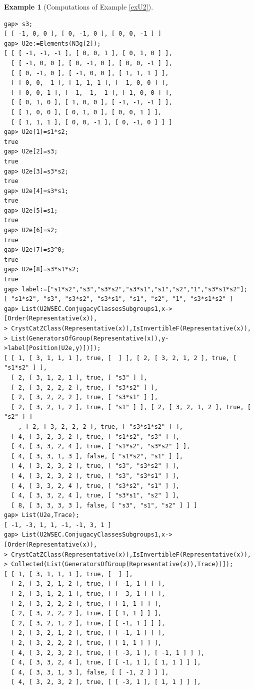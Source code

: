\documentclass{amsart}
\theoremstyle{plain}
\theoremstyle{definition}
\newtheorem{example}[theorem]{Example}
\theoremstyle{remark}
\begin{document}
\begin{example}[{Computations of Example \ref{exU2}}]
\begin{verbatim}
gap> s3;
[ [ -1, 0, 0 ], [ 0, -1, 0 ], [ 0, 0, -1 ] ]
gap> U2e:=Elements(N3g[2]);
[ [ [ -1, -1, -1 ], [ 0, 0, 1 ], [ 0, 1, 0 ] ], 
  [ [ -1, 0, 0 ], [ 0, -1, 0 ], [ 0, 0, -1 ] ], 
  [ [ 0, -1, 0 ], [ -1, 0, 0 ], [ 1, 1, 1 ] ], 
  [ [ 0, 0, -1 ], [ 1, 1, 1 ], [ -1, 0, 0 ] ], 
  [ [ 0, 0, 1 ], [ -1, -1, -1 ], [ 1, 0, 0 ] ], 
  [ [ 0, 1, 0 ], [ 1, 0, 0 ], [ -1, -1, -1 ] ], 
  [ [ 1, 0, 0 ], [ 0, 1, 0 ], [ 0, 0, 1 ] ], 
  [ [ 1, 1, 1 ], [ 0, 0, -1 ], [ 0, -1, 0 ] ] ]
gap> U2e[1]=s1*s2;
true
gap> U2e[2]=s3;
true
gap> U2e[3]=s3*s2;
true
gap> U2e[4]=s3*s1;
true
gap> U2e[5]=s1;
true
gap> U2e[6]=s2;
true
gap> U2e[7]=s3^0;
true
gap> U2e[8]=s3*s1*s2;
true
gap> label:=["s1*s2","s3","s3*s2","s3*s1","s1","s2","1","s3*s1*s2"];
[ "s1*s2", "s3", "s3*s2", "s3*s1", "s1", "s2", "1", "s3*s1*s2" ]
gap> List(U2WSEC.ConjugacyClassesSubgroups1,x->[Order(Representative(x)),
> CrystCatZClass(Representative(x)),IsInvertibleF(Representative(x)),
> List(GeneratorsOfGroup(Representative(x)),y->label[Position(U2e,y)])]);
[ [ 1, [ 3, 1, 1, 1 ], true, [  ] ], [ 2, [ 3, 2, 1, 2 ], true, [ "s1*s2" ] ],
  [ 2, [ 3, 1, 2, 1 ], true, [ "s3" ] ], 
  [ 2, [ 3, 2, 2, 2 ], true, [ "s3*s2" ] ], 
  [ 2, [ 3, 2, 2, 2 ], true, [ "s3*s1" ] ], 
  [ 2, [ 3, 2, 1, 2 ], true, [ "s1" ] ], [ 2, [ 3, 2, 1, 2 ], true, [ "s2" ] ]
    , [ 2, [ 3, 2, 2, 2 ], true, [ "s3*s1*s2" ] ], 
  [ 4, [ 3, 2, 3, 2 ], true, [ "s1*s2", "s3" ] ], 
  [ 4, [ 3, 3, 2, 4 ], true, [ "s1*s2", "s3*s2" ] ], 
  [ 4, [ 3, 3, 1, 3 ], false, [ "s1*s2", "s1" ] ], 
  [ 4, [ 3, 2, 3, 2 ], true, [ "s3", "s3*s2" ] ], 
  [ 4, [ 3, 2, 3, 2 ], true, [ "s3", "s3*s1" ] ], 
  [ 4, [ 3, 3, 2, 4 ], true, [ "s3*s2", "s1" ] ], 
  [ 4, [ 3, 3, 2, 4 ], true, [ "s3*s1", "s2" ] ], 
  [ 8, [ 3, 3, 3, 3 ], false, [ "s3", "s1", "s2" ] ] ]
gap> List(U2e,Trace);
[ -1, -3, 1, 1, -1, -1, 3, 1 ]
gap> List(U2WSEC.ConjugacyClassesSubgroups1,x->[Order(Representative(x)),
> CrystCatZClass(Representative(x)),IsInvertibleF(Representative(x)),
> Collected(List(GeneratorsOfGroup(Representative(x)),Trace))]);
[ [ 1, [ 3, 1, 1, 1 ], true, [  ] ], 
  [ 2, [ 3, 2, 1, 2 ], true, [ [ -1, 1 ] ] ], 
  [ 2, [ 3, 1, 2, 1 ], true, [ [ -3, 1 ] ] ], 
  [ 2, [ 3, 2, 2, 2 ], true, [ [ 1, 1 ] ] ], 
  [ 2, [ 3, 2, 2, 2 ], true, [ [ 1, 1 ] ] ], 
  [ 2, [ 3, 2, 1, 2 ], true, [ [ -1, 1 ] ] ], 
  [ 2, [ 3, 2, 1, 2 ], true, [ [ -1, 1 ] ] ], 
  [ 2, [ 3, 2, 2, 2 ], true, [ [ 1, 1 ] ] ], 
  [ 4, [ 3, 2, 3, 2 ], true, [ [ -3, 1 ], [ -1, 1 ] ] ], 
  [ 4, [ 3, 3, 2, 4 ], true, [ [ -1, 1 ], [ 1, 1 ] ] ], 
  [ 4, [ 3, 3, 1, 3 ], false, [ [ -1, 2 ] ] ], 
  [ 4, [ 3, 2, 3, 2 ], true, [ [ -3, 1 ], [ 1, 1 ] ] ], 

\end{verbatim}
\end{example}
\end{document}
